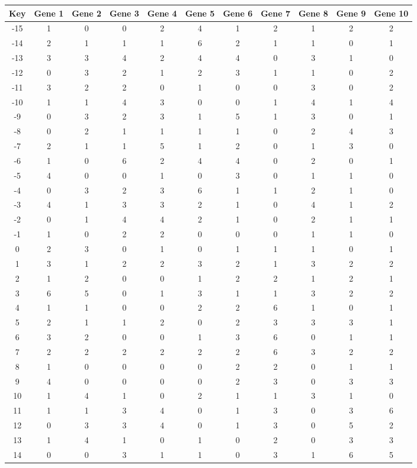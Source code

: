 \begin{tabular}{|c|c|c|c|c|c|c|c|c|c|c|}
\hline
Key & Gene 1 & Gene 2 & Gene 3 & Gene 4 & Gene 5 & Gene 6 & Gene 7 & Gene 8 & Gene 9 & Gene 10 \\
\hline
-15 & 1 & 0 & 0 & 2 & 4 & 1 & 2 & 1 & 2 & 2 \\
-14 & 2 & 1 & 1 & 1 & 6 & 2 & 1 & 1 & 0 & 1 \\
-13 & 3 & 3 & 4 & 2 & 4 & 4 & 0 & 3 & 1 & 0 \\
-12 & 0 & 3 & 2 & 1 & 2 & 3 & 1 & 1 & 0 & 2 \\
-11 & 3 & 2 & 2 & 0 & 1 & 0 & 0 & 3 & 0 & 2 \\
-10 & 1 & 1 & 4 & 3 & 0 & 0 & 1 & 4 & 1 & 4 \\
-9 & 0 & 3 & 2 & 3 & 1 & 5 & 1 & 3 & 0 & 1 \\
-8 & 0 & 2 & 1 & 1 & 1 & 1 & 0 & 2 & 4 & 3 \\
-7 & 2 & 1 & 1 & 5 & 1 & 2 & 0 & 1 & 3 & 0 \\
-6 & 1 & 0 & 6 & 2 & 4 & 4 & 0 & 2 & 0 & 1 \\
-5 & 4 & 0 & 0 & 1 & 0 & 3 & 0 & 1 & 1 & 0 \\
-4 & 0 & 3 & 2 & 3 & 6 & 1 & 1 & 2 & 1 & 0 \\
-3 & 4 & 1 & 3 & 3 & 2 & 1 & 0 & 4 & 1 & 2 \\
-2 & 0 & 1 & 4 & 4 & 2 & 1 & 0 & 2 & 1 & 1 \\
-1 & 1 & 0 & 2 & 2 & 0 & 0 & 0 & 1 & 1 & 0 \\
0 & 2 & 3 & 0 & 1 & 0 & 1 & 1 & 1 & 0 & 1 \\
1 & 3 & 1 & 2 & 2 & 3 & 2 & 1 & 3 & 2 & 2 \\
2 & 1 & 2 & 0 & 0 & 1 & 2 & 2 & 1 & 2 & 1 \\
3 & 6 & 5 & 0 & 1 & 3 & 1 & 1 & 3 & 2 & 2 \\
4 & 1 & 1 & 0 & 0 & 2 & 2 & 6 & 1 & 0 & 1 \\
5 & 2 & 1 & 1 & 2 & 0 & 2 & 3 & 3 & 3 & 1 \\
6 & 3 & 2 & 0 & 0 & 1 & 3 & 6 & 0 & 1 & 1 \\
7 & 2 & 2 & 2 & 2 & 2 & 2 & 6 & 3 & 2 & 2 \\
8 & 1 & 0 & 0 & 0 & 0 & 2 & 2 & 0 & 1 & 1 \\
9 & 4 & 0 & 0 & 0 & 0 & 2 & 3 & 0 & 3 & 3 \\
10 & 1 & 4 & 1 & 0 & 2 & 1 & 1 & 3 & 1 & 0 \\
11 & 1 & 1 & 3 & 4 & 0 & 1 & 3 & 0 & 3 & 6 \\
12 & 0 & 3 & 3 & 4 & 0 & 1 & 3 & 0 & 5 & 2 \\
13 & 1 & 4 & 1 & 0 & 1 & 0 & 2 & 0 & 3 & 3 \\
14 & 0 & 0 & 3 & 1 & 1 & 0 & 3 & 1 & 6 & 5 \\
\hline
\end{tabular}